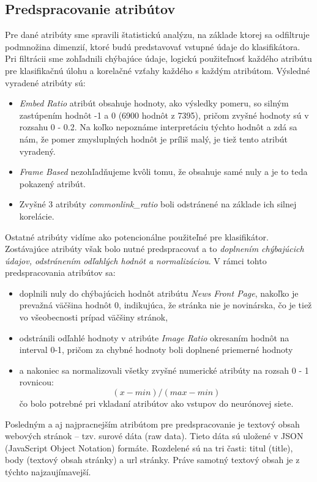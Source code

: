 \documentclass{iitsrc}
\begin{document}
\begin{multicols}{2}
\section{Predspracovanie atribútov}
Pre dané atribúty sme spravili štatistickú analýzu, na základe ktorej sa odfiltruje podmnožina dimenzií, ktoré budú predstavovať vstupné údaje do klasifikátora. Pri filtrácii sme zohľadnili chýbajúce údaje, logickú použiteľnosť každého atribútu pre klasifikačnú úlohu a korelačné vzťahy každého s každým atribútom. Výsledné vyradené atribúty sú:
%
\begin{itemize}
	\item \emph{Embed Ratio} atribút obsahuje hodnoty, ako výsledky pomeru, so silným zastúpením hodnôt -1 a 0 (6900 hodnôt z 7395), pričom zvyšné hodnoty sú v rozsahu 0 - 0.2. Na koľko nepoznáme interpretáciu týchto hodnôt a zdá sa nám, že pomer zmysluplných hodnôt je príliš malý, je tiež tento atribút vyradený.
%
	\item \emph{Frame Based} nezohľadňujeme kvôli tomu, že obsahuje samé nuly a je to teda pokazený atribút.
%
	\item Zvyšné 3 atribúty \emph{commonlink\_ratio} boli odstránené na základe ich silnej korelácie.
\end{itemize}
%
Ostatné atribúty vidíme ako potencionálne použiteľné pre klasifikátor. Zostávajúce atribúty však bolo nutné predspracovať a to \emph{doplnením chýbajúcich údajov, odstránením odľahlých hodnôt a normalizáciou}.
%
V rámci tohto predspracovania atribútov sa:
%
\begin{itemize}
	\item doplnili nuly do chýbajúcich hodnôt atribútu \emph{News Front Page}, nakoľko je prevažná väčšina hodnôt 0, indikujúca, že stránka nie je novinárska, čo je tiež vo všeobecnosti prípad väčšiny stránok,
	\item odstránili odľahlé hodnoty v atribúte \emph{Image Ratio} okresaním hodnôt na interval 0-1, pričom za chybné hodnoty boli doplnené priemerné hodnoty
	\item a nakoniec sa normalizovali všetky zvyšné numerické atribúty na rozsah 0 - 1 rovnicou:
	\begin{equation}
	(x - min)/(max - min)
	\end{equation}
	čo bolo potrebné pri vkladaní atribútov ako vstupov do neurónovej siete.
\end{itemize}
%
Posledným a aj najpracnejším atribútom pre predspracovanie je textový obsah webových stránok – tzv. surové dáta (raw data). Tieto dáta sú uložené v JSON (JavaScript Object Notation) formáte. Rozdelené sú na tri časti: titul (title), body (textový obsah stránky) a url stránky. Práve samotný textový obsah je z týchto najzaujímavejší.

\end{multicols}
\end{document}
